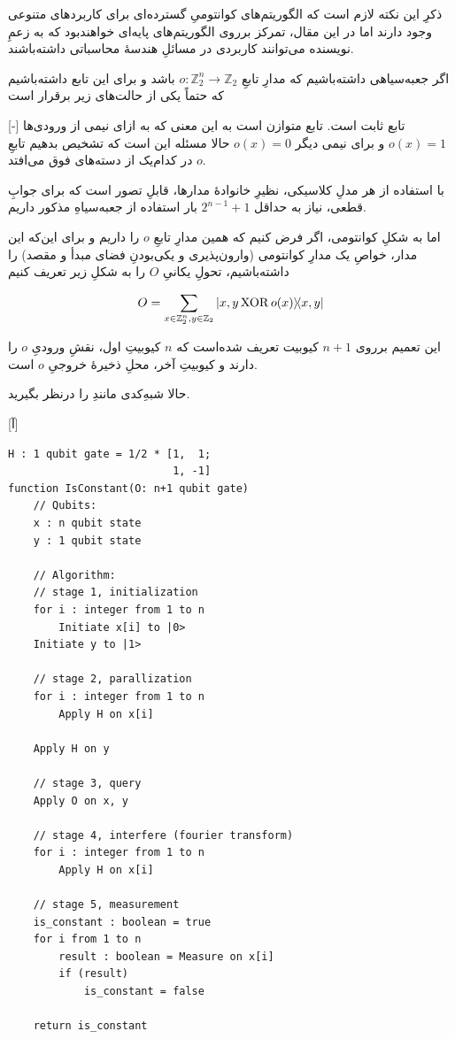 
ذکرِ این نکته لازم است که الگوریتم‌های کوانتومیِ گسترده‌ای برای کاربردهای متنوعی وجود دارند
 اما در این مقال، تمرکز برروی الگوریتم‌های پایه‌ای خواهندبود که به زعمِ نویسنده می‌توانند کاربردی در مسائلِ هندسهٔ محاسباتی داشته‌باشند.



اگر جعبه‌سیاهی داشته‌باشیم که مدارِ تابعِ 
\( o : \mathbb{Z}_2^n \to \mathbb{Z}_2 \)
باشد و برای این تابع داشته‌باشیم که حتماً یکی از حالت‌های زیر برقرار است

[-]
 تابع ثابت است.
 تابع متوازن است به این معنی که به ازای نیمی از ورودی‌ها 
\( o(x) = 1 \)
و برای نیمی دیگر
\( o(x) = 0 \)
حالا مسئله این است که تشخیص بدهیم تابعِ \(o\) در کدام‌یک از دسته‌های فوق می‌افتد.

با استفاده از هر مدلِ  کلاسیکی، نظیرِ خانوادهٔ مدارها، قابلِ تصور است که برای جوابِ قطعی، نیاز به حداقل
\(2^{n-1}+1\)
بار استفاده از جعبه‌سیاهِ مذکور داریم.

اما به شکلِ کوانتومی، اگر فرض کنیم که همین مدارِ تابعِ \(o\) را داریم و برای این‌که این مدار، خواصِ یک مدارِ کوانتومی (وارون‌پذیری و یکی‌بودنِ فضای مبدأ و مقصد) را داشته‌باشیم، تحولِ یکانیِ \(O\) را به شکلِ زیر تعریف کنیم

\begin{equation}
    O = \sum_{x \in \mathbb{Z}_2^n, y \in \mathbb{Z}_2} \dyad{x, y \XOR o(x)}{x, y}
\end{equation} 

این تعمیم برروی \(n+1\) کیوبیت تعریف شده‌است که \(n\) کیوبیتِ اول، نقشِ ورودیِ \(o\) را دارند و کیوبیتِ آخر، محلِ ذخیرهٔ خروجیِ \(o\) است.

حالا شبهِ‌کدی مانندِ  را درنظر بگیرید.

[آ]
\begin{latin}
\begin{lstlisting}
H : 1 qubit gate = 1/2 * [1,  1;
                          1, -1]
function IsConstant(O: n+1 qubit gate)   
    // Qubits:
    x : n qubit state
    y : 1 qubit state

    // Algorithm:
    // stage 1, initialization
    for i : integer from 1 to n
        Initiate x[i] to |0>
    Initiate y to |1>

    // stage 2, parallization
    for i : integer from 1 to n
        Apply H on x[i]
       
    Apply H on y
        
    // stage 3, query
    Apply O on x, y
    
    // stage 4, interfere (fourier transform)
    for i : integer from 1 to n
        Apply H on x[i]

    // stage 5, measurement
    is_constant : boolean = true
    for i from 1 to n
        result : boolean = Measure on x[i]
        if (result)
            is_constant = false
            
    return is_constant
\end{lstlisting}
\end{latin}

